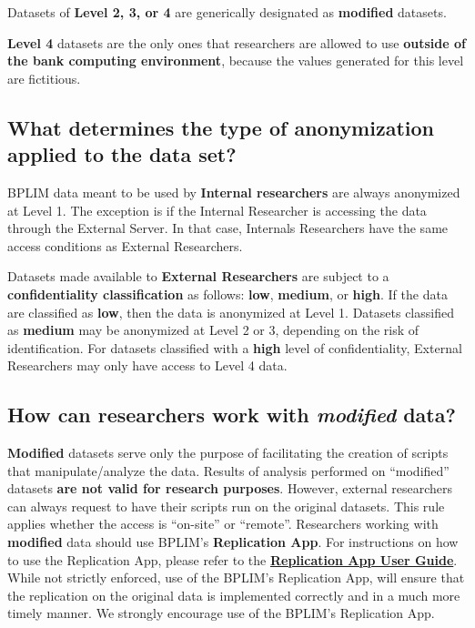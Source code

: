 \documentclass[
  a4paper,
  DIV=11,
  numbers=noendperiod]{scrartcl}
\begin{document}
Datasets of \textbf{Level 2, 3, or 4} are generically designated as
\textbf{modified} datasets.

\textbf{Level 4} datasets are the only ones that researchers are allowed
to use \textbf{outside of the bank computing environment}, because the
values generated for this level are fictitious.

\hypertarget{what-determines-the-type-of-anonymization-applied-to-the-data-set}{%
\subsection{What determines the type of anonymization applied to the
data
set?}\label{what-determines-the-type-of-anonymization-applied-to-the-data-set}}

BPLIM data meant to be used by \textbf{Internal researchers} are always
anonymized at Level 1. The exception is if the Internal Researcher is
accessing the data through the External Server. In that case, Internals
Researchers have the same access conditions as External Researchers.

Datasets made available to \textbf{External Researchers} are subject to
a \textbf{confidentiality classification} as follows: \textbf{low},
\textbf{medium}, or \textbf{high}. If the data are classified as
\textbf{low}, then the data is anonymized at Level 1. Datasets
classified as \textbf{medium} may be anonymized at Level 2 or 3,
depending on the risk of identification. For datasets classified with a
\textbf{high} level of confidentiality, External Researchers may only
have access to Level 4 data.

\hypertarget{how-can-researchers-work-with-modified-data}{%
\subsection{\texorpdfstring{How can researchers work with
\emph{modified}
data?}{How can researchers work with modified data?}}\label{how-can-researchers-work-with-modified-data}}

\textbf{Modified} datasets serve only the purpose of facilitating the
creation of scripts that manipulate/analyze the data. Results of
analysis performed on ``modified'' datasets \textbf{are not valid for
research purposes}. However, external researchers can always request to
have their scripts run on the original datasets. This rule applies
whether the access is ``on-site'' or ``remote''. Researchers working
with \textbf{modified} data should use BPLIM's \textbf{Replication App}.
For instructions on how to use the Replication App, please refer to the
\href{https://github.com/BPLIM/ReplicationApp/blob/main/Server/UserGuide.md}{\textbf{Replication
App User Guide}}. While not strictly enforced, use of the BPLIM's
Replication App, will ensure that the replication on the original data
is implemented correctly and in a much more timely manner. We strongly
encourage use of the BPLIM's Replication App.
\end{document}
